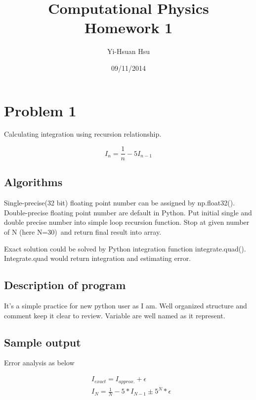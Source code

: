 \documentclass[12pt]{article}
\begin{document}
\title{Computational Physics \\ Homework 1}
\author{Yi-Hsuan Hsu}
\date{09/11/2014}
\maketitle


\section{Problem 1}

Calculating integration using recursion relationship. 

\begin{equation}
I_n = \frac{1}{n} - 5I_{n-1}
\end{equation}

\subsection{Algorithms}

Single-precise(32 bit) floating point number can be assigned by np.float32(). Double-precise floating point number are default in Python. Put initial single and double precise number into simple loop recursion function. Stop at given number of N (here N=30)\ and return final result into array.

Exact solution could be solved by Python integration function integrate.quad(). Integrate.quad would return integration and estimating error. 

\subsection{Description of program}

It's a simple practice for new python user as I am. Well organized structure and comment keep it clear to review. Variable are well named as it represent.

\subsection{Sample output}

Error analysis as below

\begin{eqnarray}
&I_{exact} = I_{approx.} + \epsilon\\
&I_N = \frac{1}{N} - 5*I_{N-1} \pm 5^N*\epsilon
\end{eqnarray}
\end{document}
